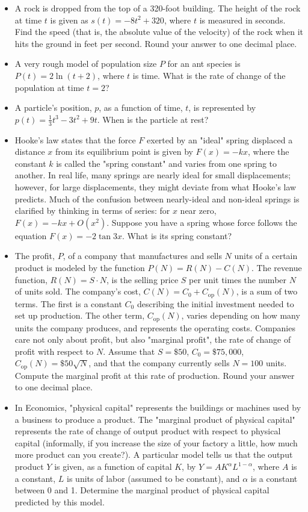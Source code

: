 \documentclass[twoside,openright,titlepage,a4paper]{book}
\begin{document}
\begin{sloppypar}
\begin{itemize}
\item A rock is dropped from the top of a 320-foot building. The height of the rock at time $t$ is given as $s(t)=-8t^2+320$, where $t$ is measured in seconds. Find the speed (that is, the absolute value of the velocity) of the rock when it hits the ground in feet per second. Round your answer to one decimal place.
\item A very rough model of population size $P$ for an ant species is $P(t) = 2\ln(t+2)$, where $t$ is time. What is the rate of change of the population at time $t = 2$?
\item A particle's position, $p$, as a function of time, $t$, is represented by $\displaystyle p(t) = \frac{1}{3}t^3 - 3t^2 + 9t$. When is the particle at rest?
\item Hooke's law states that the force $F$ exerted by an "ideal" spring displaced a distance $x$ from its equilibrium point is given by $F(x) = -kx$, where the constant $k$ is called the "spring constant" and varies from one spring to another. In real life, many springs are nearly ideal for small displacements; however, for large displacements, they might deviate from what Hooke's law predicts. Much of the confusion between nearly-ideal and non-ideal springs is clarified by thinking in terms of series: for $x$ near zero, $F(x) = -kx + O(x^2)$. Suppose you have a spring whose force follows the equation $F(x) = - 2 \tan 3x$. What is its spring constant?
\item The profit, $P$, of a company that manufactures and sells $N$ units of a certain product is modeled by the function $ P(N) = R(N) - C(N) $. The revenue function, $R(N)=S\cdot N$, is the selling price $S$ per unit times the number $N$ of units sold. The company's cost, $C(N)=C_0+C_\mathrm{op}(N)$, is a sum of two terms. The first is a constant $C_0$ describing the initial investment needed to set up production. The other term, $C_\mathrm{op}(N)$, varies depending on how many units the company produces, and represents the operating costs. Companies care not only about profit, but also "marginal profit", the rate of change of profit with respect to $N$. Assume that $S = \$50$, $C_0 = \$75,000$, $C_\mathrm{op}(N) = \$50 \sqrt{N}$, and that the company currently sells $N=100$ units. Compute the marginal profit at this rate of production. Round your answer to one decimal place.
\item In Economics, "physical capital" represents the buildings or machines used by a business to produce a product. The "marginal product of physical capital" represents the rate of change of output product with respect to physical capital (informally, if you increase the size of your factory a little, how much more product can you create?). A particular model tells us that the output product $Y$ is given, as a function of capital $K$, by $ Y = A K^{\alpha} L^{1-\alpha} $, where $A$ is a constant, $L$ is units of labor (assumed to be constant), and $\alpha$ is a constant between 0 and 1. Determine the marginal product of physical capital predicted by this model.
\end{itemize}


\end{sloppypar}
\end{document}
